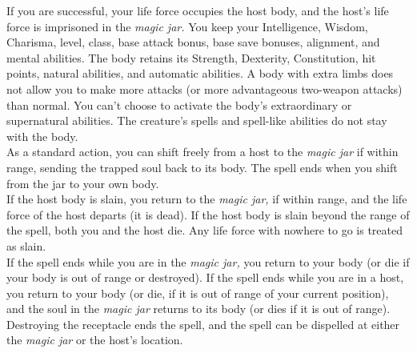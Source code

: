 If you are successful, your life force occupies the host body, and the host's life force is imprisoned in the \textit{magic jar. }You keep your Intelligence, Wisdom, Charisma, level, class, base attack bonus, base save bonuses, alignment, and mental abilities. The body retains its Strength, Dexterity, Constitution, hit points, natural abilities, and automatic abilities. A body with extra limbs does not allow you to make more attacks (or more advantageous two-weapon attacks) than normal. You can't choose to activate the body's extraordinary or supernatural abilities. The creature's spells and spell-like abilities do not stay with the body.\\
As a standard action, you can shift freely from a host to the \textit{magic jar }if within range, sending the trapped soul back to its body. The spell ends when you shift from the jar to your own body.\\
If the host body is slain, you return to the \textit{magic jar, }if within range, and the life force of the host departs (it is dead). If the host body is slain beyond the range of the spell, both you and the host die. Any life force with nowhere to go is treated as slain.\\
If the spell ends while you are in the \textit{magic jar, }you return to your body (or die if your body is out of range or destroyed). If the spell ends while you are in a host, you return to your body (or die, if it is out of range of your current position), and the soul in the \textit{magic jar }returns to its body (or dies if it is out of range). Destroying the receptacle ends the spell, and the spell can be dispelled at either the \textit{magic jar }or the host's location.\\
